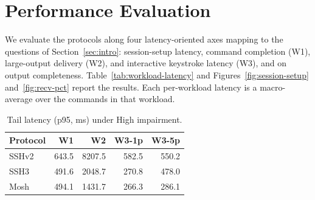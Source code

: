 \section{Performance Evaluation}
\label{sec:evaluation}

We evaluate the protocols along four latency-oriented axes mapping to the questions of Section~\ref{sec:intro}: session-setup latency, command completion (W1), large-output delivery (W2), and interactive keystroke latency (W3), and on output completeness. Table~\ref{tab:workload-latency} and Figures~\ref{fig:session-setup} and~\ref{fig:recv-pct} report the results. Each per-workload latency is a macro-average over the commands in that workload.

\begin{table}[t]
\centering
\caption{Mean latency (ms) for the three workloads across protocols and network scenarios. \textbf{Bold} marks the lowest value in each column.}
\label{tab:workload-latency}
\end{table}

\begin{table}[t]
\centering
\caption{Tail latency (p95, ms) under High impairment.}
\label{tab:tail-p95}
\setlength{\tabcolsep}{5pt}
\begin{tabular}{l|rrrr}
\hline
\textbf{Protocol} & \textbf{W1} & \textbf{W2} & \textbf{W3-1p} & \textbf{W3-5p} \\
\hline
SSHv2 & 643.5 & 8207.5 & 582.5 & 550.2 \\
SSH3  & 491.6 & 2048.7 & 270.8 & 478.0 \\
Mosh  & 494.1 & 1431.7 & 266.3 & 286.1 \\
\hline
\end{tabular}
\end{table}

